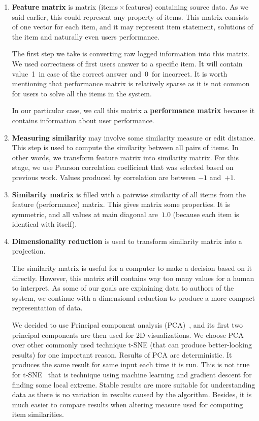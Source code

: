 \documentclass[
  printed, %
  table,   %
  nolof,     %
  nolot,     %
  color,
  final,
  nocover
]{fithesis3}
\begin{document}
\begin{enumerate}
  \item
    \textbf{Feature matrix} is matrix (items\,$\times$\,features) containing source data. As we said earlier, this could represent any property of items. This matrix consists of one vector for each item, and it may represent item statement, solutions of the item and naturally even users performance.

    The first step we take is converting raw logged information into this matrix. We used correctness of first users answer to a specific item. It will contain value~1~in case of the correct answer and~0~for incorrect. It is worth mentioning that performance matrix is relatively sparse as it is not common for users to solve all the items in the system.

    In our particular case, we call this matrix a \textbf{performance matrix} because it contains information about user performance.

  \item
    \textbf{Measuring similarity} may involve some similarity measure or edit distance. This step is used to compute the similarity between all pairs of items. In other words, we transform feature matrix into similarity matrix. For this stage, we use Pearson correlation coefficient that was selected based on previous work. Values produced by correlation are between $-1$ and~$+1$.

  \item
    \textbf{Similarity matrix} is filled with a pairwise similarity of all items from the feature (performance) matrix. This gives matrix some properties. It is symmetric, and all values at main diagonal are~$1.0$ (because each item is identical with itself).

  \item
    \textbf{Dimensionality reduction} is used to transform similarity matrix into a projection.


    The similarity matrix is useful for a computer to make a decision based on it directly. However, this matrix still contains way too many values for a human to interpret. As some of our goals are explaining data to authors of the system, we continue with a dimensional reduction to produce a more compact representation of data.


    We decided to use Principal component analysis (PCA)~\cite{wold1987principal}, and its first two principal components are then used for 2D visualizations. We choose PCA over other commonly used technique t-SNE (that can produce better-looking results) for one important reason. Results of PCA are deterministic. It produces the same result for same input each time it is run. This is not true for t-SNE~\cite{maaten2008visualizing} that is technique using machine learning and gradient descent for finding some local extreme. Stable results are more suitable for understanding data as there is no variation in results caused by the algorithm. Besides, it is much easier to compare results when altering measure used for computing item similarities.


\end{enumerate}
\end{document}
